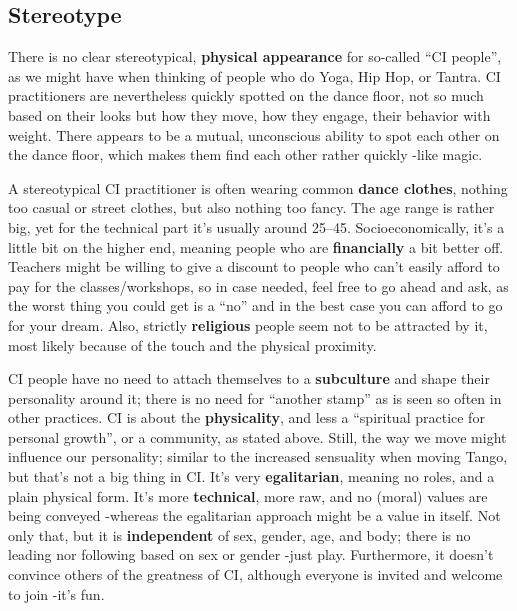 \subsection{Stereotype}\label{sec:stereotype}

There is no clear stereotypical, \textbf{physical appearance} for so-called ``CI people'', as we might have when thinking of people who do Yoga, Hip Hop, or Tantra.
CI practitioners are nevertheless quickly spotted on the dance floor, not so much based on their looks but how they move, how they engage, their behavior with weight.
There appears to be a mutual, unconscious ability to spot each other on the dance floor, which makes them find each other rather quickly -like magic.

A stereotypical CI practitioner is often wearing common \textbf{dance clothes}, nothing too casual or street clothes, but also nothing too fancy.
The age range is rather big, yet for the technical part it's usually around 25--45.
Socioeconomically, it's a little bit on the higher end, meaning people who are \textbf{financially} a bit better off.
Teachers might be willing to give a discount to people who can't easily afford to pay for the classes/workshops, so in case needed, feel free to go ahead and ask, as the worst thing you could get is a ``no'' and in the best case you can afford to go for your dream.
Also, strictly \textbf{religious} people seem not to be attracted by it, most likely because of the touch and the physical proximity.

CI people have no need to attach themselves to a \textbf{subculture} and shape their personality around it; there is no need for ``another stamp'' as is seen so often in other practices.
CI is about the \textbf{physicality}, and less a ``spiritual practice for personal growth'', or a community, as stated above.
Still, the way we move might influence our personality; similar to the increased sensuality when moving Tango, but that's not a big thing in CI\@.
It's very \textbf{egalitarian}, meaning no roles, and a plain physical form.
It's more \textbf{technical}, more raw, and no (moral) values are being conveyed -whereas the egalitarian approach might be a value in itself.
Not only that, but it is \textbf{independent} of sex, gender, age, and body; there is no leading nor following based on sex or gender -just play.
Furthermore, it doesn't convince others of the greatness of CI, although everyone is invited and welcome to join -it's fun.

